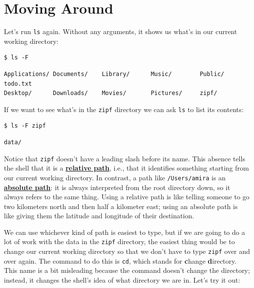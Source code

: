 \documentclass[
]{krantz}
\newcommand{\gref}[2]{\hyperlink{#2}{\textbf{#1}}}
\begin{document}
\hypertarget{bash-basics-navigate}{%
\section{Moving Around}\label{bash-basics-navigate}}

Let's run \texttt{ls} again.
Without any arguments,
it shows us what's in our current working directory:

\begin{verbatim}
$ ls -F
\end{verbatim}

\begin{verbatim}
Applications/ Documents/    Library/      Music/        Public/        todo.txt
Desktop/      Downloads/    Movies/       Pictures/     zipf/
\end{verbatim}

If we want to see what's in the \texttt{zipf} directory
we can ask \texttt{ls} to list its contents:

\begin{verbatim}
$ ls -F zipf
\end{verbatim}

\begin{verbatim}
data/
\end{verbatim}

Notice that \texttt{zipf} doesn't have a leading slash before its name.
This absence tells the shell that it is a \gref{relative path}{relative\_path},
i.e.,
that it identifies something starting from our current working directory.
In contrast,
a path like \texttt{/Users/amira} is an \gref{absolute path}{absolute\_path}:
it is always interpreted from the root directory down,
so it always refers to the same thing.
Using a relative path is like telling someone to go two kilometers north and then half a kilometer east;
using an absolute path is like giving them the latitude and longitude of their destination.

We can use whichever kind of path is easiest to type,
but if we are going to do a lot of work with the data in the \texttt{zipf} directory,
the easiest thing would be to change our current working directory
so that we don't have to type \texttt{zipf} over and over again.
The command to do this is \texttt{cd},
which stands for \textbf{c}hange \textbf{d}irectory.
This name is a bit misleading because the command doesn't change the directory;
instead, it changes the shell's idea of what directory we are in.
Let's try it out:
\end{document}
